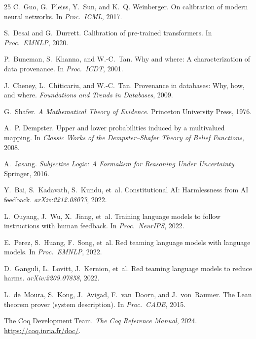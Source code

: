 \documentclass[11pt]{article}
\begin{document}
\begin{thebibliography}{25}
C.~Guo, G.~Pleiss, Y.~Sun, and K.~Q. Weinberger.
\newblock On calibration of modern neural networks.
\newblock In \emph{Proc.\ ICML}, 2017.

S.~Desai and G.~Durrett.
\newblock Calibration of pre-trained transformers.
\newblock In \emph{Proc.\ EMNLP}, 2020.

P.~Buneman, S.~Khanna, and W.-C.~Tan.
\newblock Why and where: A characterization of data provenance.
\newblock In \emph{Proc.\ ICDT}, 2001.

J.~Cheney, L.~Chiticariu, and W.-C.~Tan.
\newblock Provenance in databases: Why, how, and where.
\newblock \emph{Foundations and Trends in Databases}, 2009.

G.~Shafer.
\newblock \emph{A Mathematical Theory of Evidence}.
\newblock Princeton University Press, 1976.

A.~P. Dempster.
\newblock Upper and lower probabilities induced by a
  multivalued mapping.
\newblock In \emph{Classic Works of the Dempster--Shafer
  Theory of Belief Functions}, 2008.

A.~J{\o}sang.
\newblock \emph{Subjective Logic: A Formalism for Reasoning
  Under Uncertainty}.
\newblock Springer, 2016.

Y.~Bai, S.~Kadavath, S.~Kundu, et~al.
\newblock Constitutional {AI}: Harmlessness from {AI} feedback.
\newblock \emph{arXiv:2212.08073}, 2022.

L.~Ouyang, J.~Wu, X.~Jiang, et~al.
\newblock Training language models to follow instructions with
  human feedback.
\newblock In \emph{Proc.\ NeurIPS}, 2022.

E.~Perez, S.~Huang, F.~Song, et~al.
\newblock Red teaming language models with language models.
\newblock In \emph{Proc.\ EMNLP}, 2022.

D.~Ganguli, L.~Lovitt, J.~Kernion, et~al.
\newblock Red teaming language models to reduce harms.
\newblock \emph{arXiv:2209.07858}, 2022.

L.~de~Moura, S.~Kong, J.~Avigad, F.~van~Doorn, and
  J.~von~Raumer.
\newblock The {Lean} theorem prover (system description).
\newblock In \emph{Proc.\ CADE}, 2015.

The Coq Development Team.
\newblock \emph{The Coq Reference Manual}, 2024.
\newblock \url{https://coq.inria.fr/doc/}.


\end{thebibliography}
\end{document}

